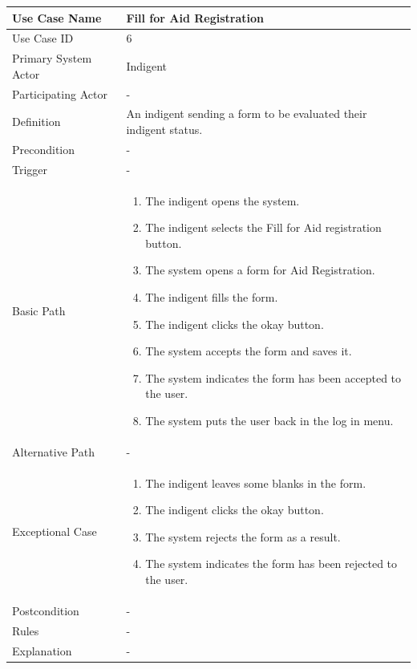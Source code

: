 \documentclass[a4paper,12pt]{report}
\begin{document}
		\begin{tabular}{|m{4cm}|m{11.5cm}|}
			\hline
				Use Case Name & Fill for Aid Registration\\
			\hline
				Use Case ID & 6\\
			\hline
				Primary System Actor & Indigent\\
			\hline
				Participating Actor & -\\
			\hline
				Definition & An indigent sending a form to be evaluated their indigent status.\\
			\hline
				Precondition & -\\
			\hline
				Trigger & -\\
			\hline
				Basic Path & \begin{enumerate}
					\item The indigent opens the system.
					\item The indigent selects the Fill for Aid registration button.
					\item The system opens a form for Aid Registration.
					\item The indigent fills the form.
					\item The indigent clicks the okay button.
					\item The system accepts the form and saves it.
					\item The system indicates the form has been accepted to the user.
					\item The system puts the user back in the log in menu.
				\end{enumerate}		
				\\
			\hline
				Alternative Path & -\\
			\hline
				Exceptional Case & \begin{enumerate}
					\item The indigent leaves some blanks in the form.
					\item The indigent clicks the okay button.
					\item The system rejects the form as a result.
					\item The system indicates the form has been rejected to the user.
				\end{enumerate}
				\\
			\hline
				Postcondition & -\\
			\hline
				Rules & -\\
			\hline
				Explanation & -\\
			\hline
		\end{tabular}
\end{document}
